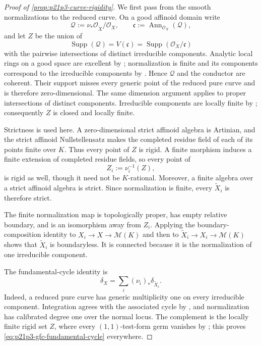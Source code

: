 \begin{proof}[Proof of \cref{prop:p21p3-curve-rigidity}]
We first pass from the smooth normalizations to the reduced curve.  On a
good affinoid domain write
\[
 \mathcal Q:=\nu_*\mathcal O_{\widetilde X}/\mathcal O_X,
 \qquad
 \mathfrak c:=\operatorname{Ann}_{\mathcal O_X}(\mathcal Q),
\]
and let $Z$ be the union of
\[
 \operatorname{Supp}(\mathcal Q)
   =V(\mathfrak c)
   =\operatorname{Supp}(\mathcal O_X/\mathfrak c)
\]
with the pairwise intersections of distinct irreducible components.
Analytic local rings on a good space are excellent by
\cite[\S11.1.10]{CLD25}; normalization is finite and its components
correspond to the irreducible components by
\cite[\S11.3.1]{CLD25}.  Hence $\mathcal Q$ and the conductor are
coherent.  Their support misses every generic point of the reduced pure
curve and is therefore zero-dimensional.  The same dimension argument
applies to proper intersections of distinct components.  Irreducible
components are locally finite by \cite[\S11.2.5]{CLD25}; consequently
$Z$ is closed and locally finite.

Strictness is used here.  A zero-dimensional strict affinoid algebra is
Artinian, and the strict affinoid Nullstellensatz makes the completed
residue field of each of its points finite over $K$.  Thus every point
of $Z$ is rigid.  A finite morphism induces a finite extension of
completed residue fields, so every point of
\begin{equation}
\label{eq:p21p3-gfc-conductor-preimage}
                         Z_i:=\nu_i^{-1}(Z),
\end{equation}
is rigid as well, though it need not be $K$-rational.  Moreover, a finite
algebra over a strict affinoid algebra is strict.  Since normalization is
finite, every $\widetilde X_i$ is therefore strict.

The finite normalization map is topologically proper, has empty relative
boundary, and is an isomorphism away from $Z_i$.  Applying the
boundary-composition identity \cite[(11.4.1.3)]{CLD25} to
$X_i\to X\to\mathcal M(K)$ and then to
$\widetilde X_i\to X_i\to\mathcal M(K)$ shows that
$\widetilde X_i$ is boundaryless.  It is connected because it is the
normalization of one irreducible component.

The fundamental-cycle identity is
\begin{equation}
\label{eq:p21p3-gfc-fundamental-cycle}
             \delta_X=\sum_i(\nu_i)_*\delta_{\widetilde X_i}.
\end{equation}
Indeed, a reduced pure curve has generic multiplicity one on every
irreducible component.  Integration agrees with the associated cycle by
\cite[Proposition~16.6.3]{CLD25}, and normalization has calibrated degree
one over the normal locus.  The complement is the locally finite rigid
set $Z$, where every $(1,1)$-test-form germ vanishes by
\cite[Proposition~3.3.6]{CLD25}; this proves
\eqref{eq:p21p3-gfc-fundamental-cycle} everywhere.


\end{proof}
